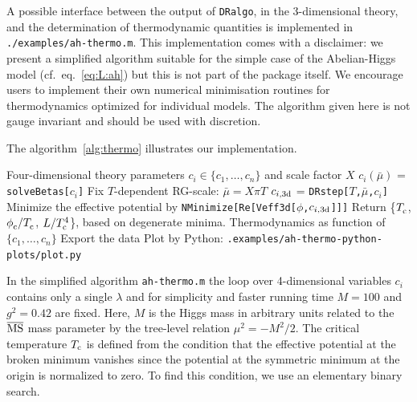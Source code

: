 \documentclass[11pt]{article}
\def\dralgo{{\tt DRalgo}}
\newcommand\MSbar{$\overline{\rm MS}$}
\newcommand{\Tc}{T_{\rm c}}
\renewcommand{\rmi}[1]{{\mbox{\scriptsize #1}}}
\begin{document}
A possible interface between
the output of \dralgo{}, in the 3-dimensional theory, and
the determination of thermodynamic quantities 
is implemented in {\tt ./examples/ah-thermo.m}.
This implementation comes with a disclaimer:
we present a simplified algorithm suitable for the simple case of
the Abelian-Higgs model (cf.~eq.~\eqref{eq:L:ah}) but this
is not part of the package itself.
We encourage users to implement their own numerical minimisation routines
for thermodynamics optimized for individual models.
The algorithm given here is not gauge invariant and
should be used with discretion. 

The algorithm~\ref{alg:thermo} illustrates our implementation.
\begin{algorithm}
\caption{
\label{alg:thermo}
  The \dralgo{} algorithm output is interfaced in
  {\tt ./examples/ah-thermo.m} with functions
  {\tt solveBetas[]},
  {\tt DRstep[]} and
  {\tt Veff3d[]}, which are called by
  {\tt findThermo[]}.
}
\begin{algorithmic}
  Four-dimensional theory parameters $c_{i} \in \{c_{1},\dots,c_{n}\}$ and
  scale factor $X$
        $c_i(\bar{\mu})$ = {\tt solveBetas[$c_i$]}
    \For{{\bf all}  $T_{i} \in \{T_{\rmi{min}},\dots,T_{\rmi{max}} \}$} 
      \State Fix $T$-dependent RG-scale: $\bar{\mu} = X\pi T$ 
        $c_{i,\rmi{3d}}$ = {\tt DRstep[$T$,$\bar{\mu}$,$c_i$]}
      \State
        Minimize the effective potential by
        {\tt NMinimize[Re[Veff3d[$\phi$,$c_{i,\rmi{3d}}$]]]}
    \EndFor
\State
  Return \{$\Tc^{ }$, $\phi_{\rmi{c}}^{ }/\Tc^{ }$, $L/\Tc^4$\},
  based on degenerate minima.
\EndCall
\EndFor
{}
Thermodynamics as function of $\{c_{1},\dots,c_{n}\}$
\State Export the data
\State Plot by Python: {\tt .examples/ah-thermo-python-plots/plot.py}
\end{algorithmic}
\end{algorithm}
In the simplified algorithm {\tt ah-thermo.m}
the loop over 4-dimensional variables $c_i$ contains only a single $\lambda$ and
for simplicity and faster running time
$M=100$ and
$g^2=0.42$ are fixed.
Here,
$M$ is the Higgs mass in arbitrary units related to
the \MSbar{} mass parameter by
the tree-level relation $\mu^2 = -M^2/2$. 
%
The critical temperature $\Tc$ is defined from the condition that
the effective potential at the broken minimum vanishes since
the potential at the symmetric minimum at the origin is normalized to zero. 
To find this condition, we use an elementary binary search.
\end{document}
